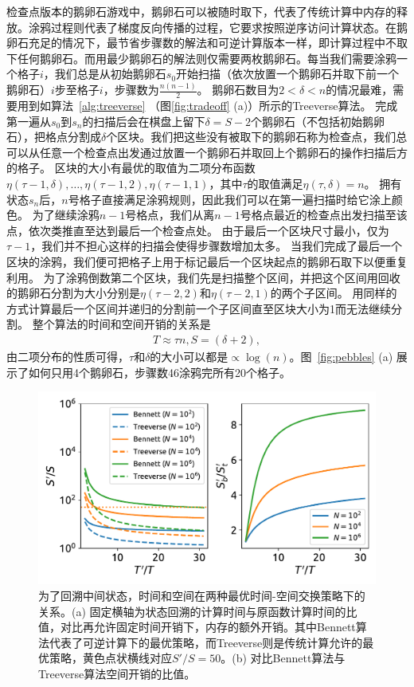 \documentclass[A4,twoside,fontset=ubuntu,UTF8]{ctexart}
\begin{document}
检查点版本的鹅卵石游戏中，鹅卵石可以被随时取下，代表了传统计算中内存的释放。涂鸦过程则代表了梯度反向传播的过程，它要求按照逆序访问计算状态。在鹅卵石充足的情况下，最节省步骤数的解法和可逆计算版本一样，即计算过程中不取下任何鹅卵石。而用最少鹅卵石的解法则仅需要两枚鹅卵石。每当我们需要涂鸦一个格子$i$，我们总是从初始鹅卵石$s_0$开始扫描（依次放置一个鹅卵石并取下前一个鹅卵石）$i$步至格子$i$，步骤数为$\frac{n(n-1)}{2}$。
鹅卵石数目为$2<\delta<n$的情况最难，需要用到如算法~\ref{alg:treeverse} （图\ref{fig:tradeoff} (a)）所示的Treeverse算法。
完成第一遍从$s_0$到$s_{n}$的扫描后会在棋盘上留下$\delta=S-2$个鹅卵石（不包括初始鹅卵石），把格点分割成$\delta$个区块。我们把这些没有被取下的鹅卵石称为检查点，我们总可以从任意一个检查点出发通过放置一个鹅卵石并取回上个鹅卵石的操作扫描后方的格子。
区块的大小有最优的取值为二项分布函数$\eta(\tau-1, \delta), \ldots, \eta(\tau-1, 2), \eta(\tau-1, 1)$，其中$\tau$的取值满足$\eta(\tau, \delta) = n$。
拥有状态$s_{n}$后，$n$号格子直接满足涂鸦规则，因此我们可以在第一遍扫描时给它涂上颜色。
为了继续涂鸦$n-1$号格点，我们从离$n-1$号格点最近的检查点出发扫描至该点，依次类推直至达到最后一个检查点处。
由于最后一个区块尺寸最小，仅为$\tau-1$，我们并不担心这样的扫描会使得步骤数增加太多。
当我们完成了最后一个区块的涂鸦，我们便可把格子上用于标记最后一个区块起点的鹅卵石取下以便重复利用。
为了涂鸦倒数第二个区块，我们先是扫描整个区间，并把这个区间用回收的鹅卵石分割为大小分别是$\eta(\tau-2, 2)$和$\eta(\tau-2, 1)$的两个子区间。
用同样的方式计算最后一个区间并递归的分割前一个子区间直至区块大小为1而无法继续分割。
整个算法的时间和空间开销的关系是
\begin{align}
    T \approx \tau n, S = (\delta+2),
\end{align}
由二项分布的性质可得，$\tau$和$\delta$的大小可以都是$\propto\log(n)$。图~\ref{fig:pebbles} (a) 展示了如何只用4个鹅卵石，步骤数46涂鸦完所有20个格子。

\begin{figure}[h]
\centering
\includegraphics[width=0.8\columnwidth]{./fig1.pdf}
    \caption{为了回溯中间状态，时间和空间在两种最优时间-空间交换策略下的关系。(a) 固定横轴为状态回溯的计算时间与原函数计算时间的比值，对比再允许固定时间开销下，内存的额外开销。其中Bennett算法代表了可逆计算下的最优策略，而Treeverse则是传统计算允许的最优策略，黄色点状横线对应$S'/S=50$。(b) 对比Bennett算法与Treeverse算法空间开销的比值。\label{fig:timespace}} 
\end{figure}
\end{document}
